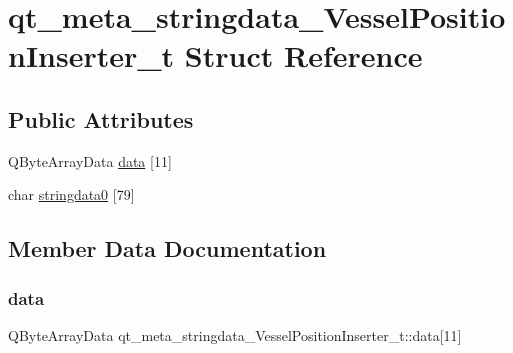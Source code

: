\hypertarget{structqt__meta__stringdata___vessel_position_inserter__t}{}\section{qt\+\_\+meta\+\_\+stringdata\+\_\+\+Vessel\+Position\+Inserter\+\_\+t Struct Reference}
\label{structqt__meta__stringdata___vessel_position_inserter__t}
\subsection*{Public Attributes}
\begin{DoxyCompactItemize}
\item 
Q\+Byte\+Array\+Data \mbox{\hyperlink{structqt__meta__stringdata___vessel_position_inserter__t_a275c00f65f2053971324cbcac7f2c027}{data}} \mbox{[}11\mbox{]}
\item 
char \mbox{\hyperlink{structqt__meta__stringdata___vessel_position_inserter__t_a99c415a737989498ac03f2b0f88537b7}{stringdata0}} \mbox{[}79\mbox{]}
\end{DoxyCompactItemize}


\subsection{Member Data Documentation}
\mbox{\label{structqt__meta__stringdata___vessel_position_inserter__t_a275c00f65f2053971324cbcac7f2c027}} 
\subsubsection{\texorpdfstring{data}{data}}
{\footnotesize\ttfamily Q\+Byte\+Array\+Data qt\+\_\+meta\+\_\+stringdata\+\_\+\+Vessel\+Position\+Inserter\+\_\+t\+::data\mbox{[}11\mbox{]}}

\mbox{\label{structqt__meta__stringdata___vessel_position_inserter__t_a99c415a737989498ac03f2b0f88537b7}} 

